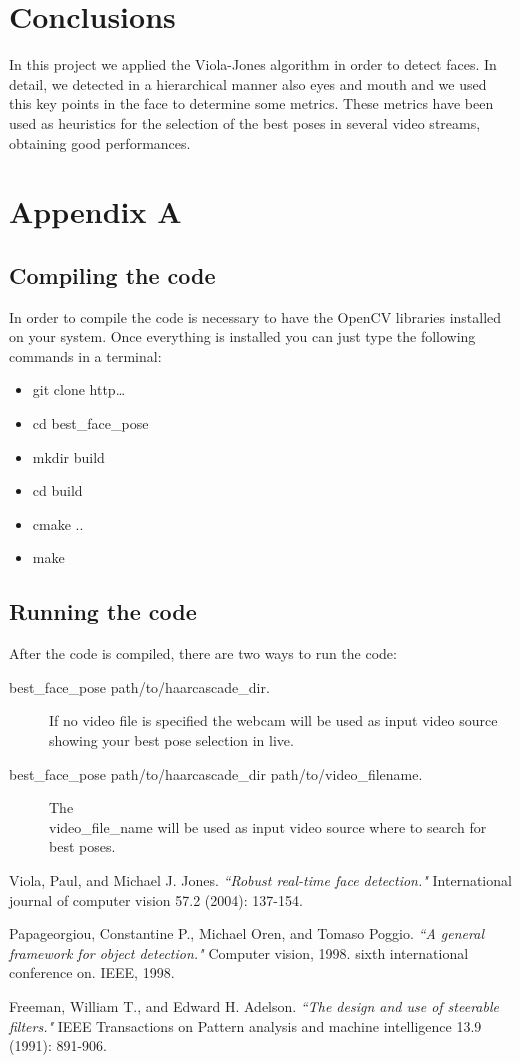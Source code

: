 \documentclass[10pt,a4paper]{report}
\begin{document}
\section*{Conclusions}
In this project we applied the Viola-Jones algorithm in order to detect faces. In detail, we detected in a hierarchical manner also eyes and mouth and we used this key points in the face to determine some metrics. These metrics have been used as heuristics for the selection of the best poses in several video streams, obtaining good performances.
\pagebreak

\section*{Appendix A}
\subsection*{Compiling the code}
In order to compile the code is necessary to have the OpenCV libraries installed on your system. Once everything is installed you can just type the following commands in a terminal:
\begin{itemize}
\item git clone http\dots
\item cd best\_face\_pose
\item mkdir build
\item cd build
\item cmake ..
\item make
\end{itemize}

\subsection*{Running the code}
After the code is compiled, there are two ways to run the code:
\begin{description}
  \item[best\_face\_pose path/to/haarcascade\_dir.] If no video file is specified the webcam will be used as input video source showing your best pose selection in live.
  \item[best\_face\_pose path/to/haarcascade\_dir path/to/video\_filename.] The\\ video\_file\_name will be used as input video source where to search for best poses.
\end{description}

\begin{thebibliography}{9}
Viola, Paul, and Michael J. Jones. \emph{``Robust real-time face detection."} International journal of computer vision 57.2 (2004): 137-154.

Papageorgiou, Constantine P., Michael Oren, and Tomaso Poggio. \emph{``A general framework for object detection."} Computer vision, 1998. sixth international conference on. IEEE, 1998.

Freeman, William T., and Edward H. Adelson. \emph{``The design and use of steerable filters."} IEEE Transactions on Pattern analysis and machine intelligence 13.9 (1991): 891-906.
\end{thebibliography}
\end{document}
